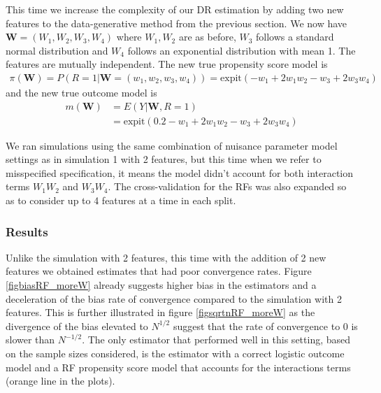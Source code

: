 \documentclass[12pt,twoside]{article}
\newcommand{\expit}{\text{expit}}
\begin{document}
This time we increase the complexity of our DR estimation by adding two new features to the data-generative method from the previous section. We now have $\mathbf{W} = (W_1,W_2,W_3,W_4)$ where $W_1,W_2$ are as before, $W_3$ follows a standard normal distribution and $W_4$ follows an exponential distribution with mean 1. The features are mutually independent. The new true propensity score model is 
\begin{align*}
    \pi(\mathbf{W}) = P(R = 1 |\mathbf{W} = (w_1,w_2, w_3,w_4)) = \expit(-w_1 + 2w_1w_2 - w_3 + 2w_3w_4)
\end{align*}
and the new true outcome model is 
\begin{align*}
    m(\mathbf{W}) &= E(Y|\mathbf{W}, R=1) \\
    & = \expit(0.2 - w_1 + 2w_1w_2 - w_3 + 2w_3w_4)
\end{align*}

We ran simulations using the same combination of nuisance parameter model settings as in simulation 1 with 2 features, but this time when we refer to misspecified specification, it means the model didn't account for both interaction terms $W_1W_2$ and $W_3W_4$. The cross-validation for the RFs was also expanded so as to consider up to 4 features at a time in each split. 

\subsubsection*{Results}

Unlike the simulation with 2 features, this time with the addition of 2 new features we obtained estimates that had poor convergence rates. Figure \ref{figbiasRF_moreW} already suggests higher bias in the estimators and a deceleration of the bias rate of convergence compared to the simulation with 2 features. This is further illustrated in figure \ref{figsqrtnRF_moreW} as the divergence of the bias elevated to $N^{1/2}$ suggest that the rate of convergence to 0 is slower than $N^{-1/2}$. The only estimator that performed well in this setting, based on the sample sizes considered, is the estimator with a correct logistic outcome model and a RF propensity score model that accounts for the interactions terms (orange line in the plots). 
\end{document}

